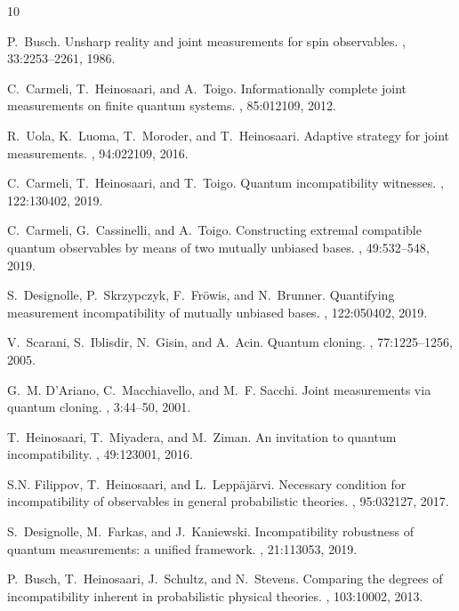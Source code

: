 \documentclass[12pt,reqno]{amsart}
\theoremstyle{definition}
\begin{document}
\begin{thebibliography}{10}

P.~Busch.
\newblock Unsharp reality and joint measurements for spin observables.
, 33:2253--2261, 1986.

C.~Carmeli, T.~Heinosaari, and A.~Toigo.
\newblock Informationally complete joint measurements on finite quantum
  systems.
, 85:012109, 2012.

R.~Uola, K.~Luoma, T.~Moroder, and T.~Heinosaari.
\newblock Adaptive strategy for joint measurements.
, 94:022109, 2016.

C.~Carmeli, T.~Heinosaari, and T.~Toigo.
\newblock Quantum incompatibility witnesses.
, 122:130402, 2019.

C.~Carmeli, G.~Cassinelli, and A.~Toigo.
\newblock Constructing extremal compatible quantum observables by means of two
  mutually unbiased bases.
, 49:532--548, 2019.

S.~Designolle, P.~Skrzypczyk, F.~Fr\"owis, and N.~Brunner.
\newblock Quantifying measurement incompatibility of mutually unbiased bases.
, 122:050402, 2019.

V.~Scarani, S.~Iblisdir, N.~Gisin, and A.~Acin.
\newblock Quantum cloning.
, 77:1225--1256, 2005.

G.~M. D'Ariano, C.~Macchiavello, and M.~F. Sacchi.
\newblock Joint measurements via quantum cloning.
, 3:44--50, 2001.

T.~Heinosaari, T.~Miyadera, and M.~Ziman.
\newblock An invitation to quantum incompatibility.
, 49:123001, 2016.

S.N. Filippov, T.~Heinosaari, and L.~Lepp\"aj\"arvi.
\newblock Necessary condition for incompatibility of observables in general
  probabilistic theories.
, 95:032127, 2017.

S.~Designolle, M.~Farkas, and J.~Kaniewski.
\newblock Incompatibility robustness of quantum measurements: a unified
  framework.
, 21:113053, 2019.

P.~Busch, T.~Heinosaari, J.~Schultz, and N.~Stevens.
\newblock Comparing the degrees of incompatibility inherent in probabilistic
  physical theories.
, 103:10002, 2013.


\end{thebibliography}
\end{document}
